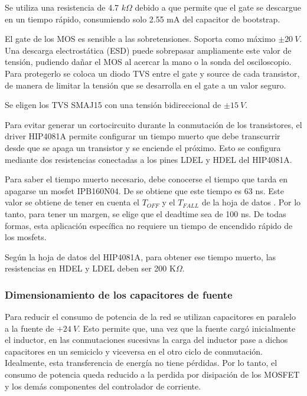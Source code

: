 \noindent Se utiliza una resistencia de 4.7 $k\Omega$ debido a que permite que el gate se descargue en un tiempo rápido, consumiendo solo 2.55 mA del capacitor de bootstrap.


\noindent El gate de los MOS es sensible a las sobretensiones. Soporta como máximo $\pm 20\:V$. Una descarga electrostática (ESD) puede sobrepasar ampliamente este valor de tensión, pudiendo dañar el MOS al acercar la mano o la sonda del osciloscopio. Para protegerlo se coloca un diodo TVS entre el gate y source de cada transistor, de manera de limitar la tensión que se desarrolla en el gate a un valor seguro.

\noindent Se eligen los TVS SMAJ15 con una tensión bidireccional de $\pm 15\:V$.


\noindent Para evitar generar un cortocircuito durante la conmutación de los transistores, el driver HIP4081A permite configurar un tiempo muerto que debe transcurrir desde que se apaga un transistor y se enciende el próximo. Esto se configura mediante dos resistencias conectadas a los pines LDEL y HDEL del HIP4081A.

\noindent Para saber el tiempo muerto necesario, debe conocerse el tiempo que tarda en apagarse un mosfet IPB160N04. De \cite{IPB160N04} se obtiene que este tiempo es 63 ns. Este valor se obtiene de tener en cuenta el $T_{OFF}$ y el $T_{FALL}$ de la hoja de datos . Por lo tanto, para tener un margen, se elige que el deadtime sea de 100 ns. De todas formas, esta aplicación específica no requiere un tiempo de encendido rápido de los mosfets.

\noindent Según la hoja de datos del HIP4081A\cite{HIP4081A_AN9405}, para obtener ese tiempo muerto, las resistencias en HDEL y LDEL deben ser 200 K$\Omega$.

\subsubsection{Dimensionamiento de los capacitores de fuente}
	
\noindent Para reducir el consumo de potencia de la red se utilizan capacitores en paralelo a la fuente de $+24\:V$. Esto permite que, una vez que la fuente cargó inicialmente el inductor, en las conmutaciones sucesivas la carga del inductor pase a dichos capacitores en un semiciclo y viceversa en el otro ciclo de conmutación. Idealmente, esta transferencia de energía no tiene pérdidas. Por lo tanto, el consumo de potencia queda reducido a la perdida por disipación de los MOSFET y los demás componentes del controlador de corriente. 

